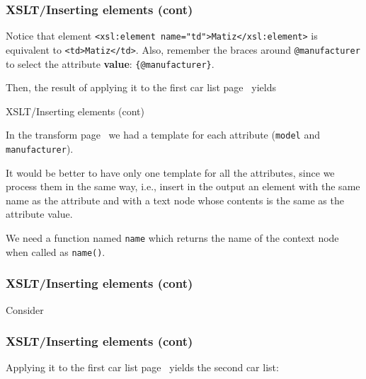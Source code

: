 %
\begin{frame}[containsverbatim]
\frametitle{XSLT/Inserting elements (cont)}

Notice that element
{\small\verb|<xsl:element name="td">Matiz</xsl:element>|} is
equivalent to {\small\verb|<td>Matiz</td>|}. Also, remember the braces
around \verb|@manufacturer| to select the attribute \textbf{value}:
\verb|{@manufacturer}|.

\bigskip

Then, the result of applying it to the first car list
page~\pageref{cars} yields 

\end{frame}

%
\begin{frame}{XSLT/Inserting elements (cont)}

In the transform page~\pageref{05list07.xsl} we had a template for
each attribute (\texttt{model} and \texttt{manufacturer}).

\bigskip

It would be better to have only one template for all the attributes,
since we process them in the same way, i.e., insert in the output an
element with the same name as the attribute and with a text node whose
contents is the same as the attribute value.

\bigskip

We need a function named \texttt{name} which returns the name of the
context node when called as \texttt{name()}.

\end{frame}

%
\begin{frame}
\frametitle{XSLT/Inserting elements (cont)}

Consider

\end{frame}

%
\begin{frame}
\frametitle{XSLT/Inserting elements (cont)}

Applying it to the first car list page~\pageref{cars} yields the
second car list: 

\end{frame}

